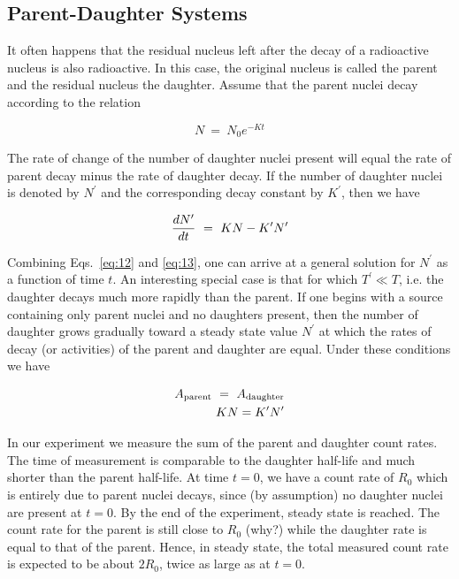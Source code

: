 \documentclass{article}
\begin{document}
\subsection{Parent-Daughter Systems}
\label{sec:parent-daughter}

It often happens that the residual nucleus left after the decay of a
radioactive nucleus is also radioactive.  In this case, the original
nucleus is called the parent and the residual nucleus the daughter.
Assume that the parent nuclei decay according to the relation

\begin{equation}
N ~=~ N_0 e^{-Kt}
\label{eq:12}
\end{equation}

The rate of change of the number of daughter nuclei present will equal
the rate of parent decay minus the rate of daughter decay.  If the
number of daughter nuclei is denoted by $N^\prime$ and the
corresponding decay constant by $K^\prime$, then we have

\begin{equation}
{dN^\prime \over dt} ~=~ KN - K^\prime N^\prime
\label{eq:13}
\end{equation}

Combining Eqs.~\ref{eq:12} and \ref{eq:13}, one can arrive at a general solution for
$N^\prime$ as a function of time $t$.
An interesting special case is that for which
$T^\prime \ll T$, i.e. the daughter decays
much more rapidly than the parent. If one begins with a source
containing only parent nuclei and no daughters present, then the
number of daughter grows gradually toward a steady
state value $N^\prime$ at which the rates of decay (or
activities) of the parent and daughter are equal.  Under these
conditions we have

\begin{eqnarray}
A_{\rm parent} ~=~ A_{\rm daughter} \\
KN = K^\prime N^\prime
\label{eq:14}
\end{eqnarray}

In our experiment we measure the sum of the parent and daughter count
rates.  The time of measurement is comparable to the daughter
half-life and much shorter than the parent half-life.  At time $t = 0$,
we have a count rate of $R_0$ which is entirely due to
parent nuclei decays, since (by assumption) no daughter nuclei are
present at $t = 0$.  By the end of the experiment, steady state is reached.
The count rate for the parent is still close
to $R_0$ (why?) while the daughter rate is equal to that
of the parent.  Hence, in steady state, the total measured count rate
is expected to be about $2R_0$, twice as large as at $t = 0$.
\end{document}
